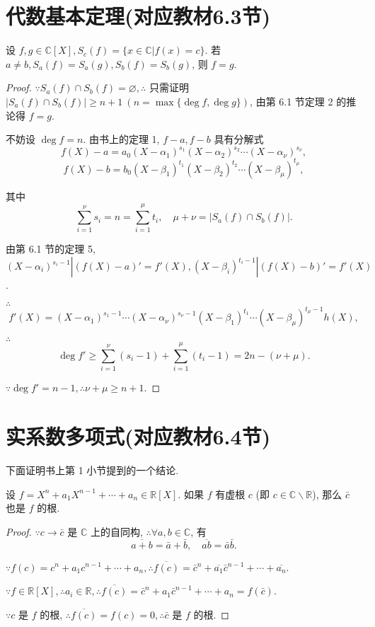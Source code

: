 \documentclass[UTF8]{ctexart}
\begin{document}
\section{代数基本定理(对应教材6.3节)}
\begin{theorem}[书上的例子的推广]
    设 $f,g\in\mathbb{C}[X],S_c(f)=\{x\in\mathbb{C}|f(x)=c\}$. 若 $a\neq b,S_a(f)=S_a(g),S_b(f)=S_b(g)$, 则 $f=g$.
\end{theorem}
\begin{proof}
    $\because S_a(f)\cap S_b(f)=\varnothing,\therefore$ 只需证明 $|S_a(f)\cap S_b(f)|\geq n+1\ (n=\max\{\deg f,\deg g\})$, 由第 6.1 节定理 2 的推论得 $f=g$.

    不妨设 $\deg f=n$. 由书上的定理 1, $f-a,f-b$ 具有分解式
    \[f(X)-a=a_0(X-\alpha_1)^{s_1}(X-\alpha_2)^{s_2}\cdots(X-\alpha_\nu)^{s_\nu},\]
    \[f(X)-b=b_0(X-\beta_1)^{t_1}(X-\beta_2)^{t_2}\cdots(X-\beta_\mu)^{t_\mu},\]

    其中
    \[\sum\limits_{i=1}^\nu s_i=n=\sum\limits_{i=1}^\mu t_i,\quad\mu+\nu=|S_a(f)\cap S_b(f)|.\]
    
    由第 6.1 节的定理 5, $(X-\alpha_i)^{s_i-1}|(f(X)-a)'=f'(X),(X-\beta_i)^{t_i-1}|(f(X)-b)'=f'(X)$.

    $\therefore$
    \[f'(X)=(X-\alpha_1)^{s_1-1}\cdots(X-\alpha_\nu)^{s_\nu-1}(X-\beta_1)^{t_1}\cdots(X-\beta_\mu)^{t_\mu-1}h(X),\]

    $\therefore$
    \[\deg f'\geq\sum\limits_{i=1}^\nu(s_i-1)+\sum\limits_{i=1}^\mu(t_i-1)=2n-(\nu+\mu).\]

    $\because\deg f'=n-1,\therefore\nu+\mu\geq n+1$.
\end{proof}
\section{实系数多项式(对应教材6.4节)}
下面证明书上第 1 小节提到的一个结论.
\begin{theorem}
    设 $f=X^n+a_1X^{n-1}+\cdots+a_n\in\mathbb{R}[X]$. 如果 $f$ 有虚根 $c$ (即 $c\in\mathbb{C}\backslash\mathbb{R}$), 那么 $\bar{c}$ 也是 $f$ 的根.
\end{theorem}
\begin{proof}
    $\because c\to\bar{c}$ 是 $\mathbb{C}$ 上的自同构, $\therefore\forall a,b\in\mathbb{C}$, 有
    \[\overline{a+b}=\bar{a}+\bar{b},\quad\overline{ab}=\bar{a}\bar{b}.\]

    $\because f(c)=c^n+a_1c^{n-1}+\cdots+a_n,\therefore\overline{f(c)}=\bar{c}^n+\overline{a_1}\bar{c}^{n-1}+\cdots+\overline{a_n}$.

    $\because f\in\mathbb{R}[X],\therefore a_i\in\mathbb{R},\therefore\overline{f(c)}=\bar{c}^n+a_1\bar{c}^{n-1}+\cdots+a_n=f(\bar{c})$.

    $\because c$ 是 $f$ 的根, $\therefore \overline{f(c)}=f(c)=0,\therefore\bar{c}$ 是 $f$ 的根.
\end{proof}
\end{document}
